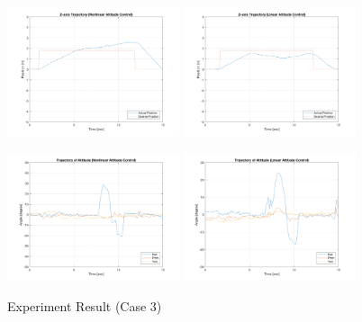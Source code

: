 \begin{figure}
    \includegraphics[width=0.45\textwidth]{graphics/experiment_plots/roll_minus_non_position_z.png}
    \includegraphics[width=0.45\textwidth]{graphics/experiment_plots/roll_minus_pid_position_z.png}

    \includegraphics[width=0.45\textwidth]{graphics/experiment_plots/roll_minus_non_attitude.png}
    \includegraphics[width=0.45\textwidth]{graphics/experiment_plots/roll_minus_pid_attitude.png}
    \caption{Experiment Result (Case 3)}
    \label{fig:exp_roll_minus}
\end{figure}

